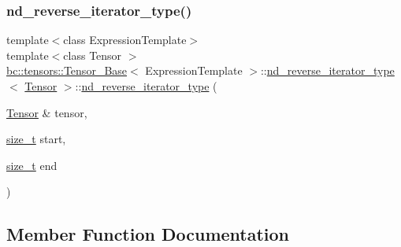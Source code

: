 \subsubsection{\texorpdfstring{nd\+\_\+reverse\+\_\+iterator\+\_\+type()}{nd\_reverse\_iterator\_type()}\hspace{0.1cm}{\footnotesize\ttfamily [3/3]}}
{\footnotesize\ttfamily template$<$class Expression\+Template$>$ \\
template$<$class Tensor $>$ \\
\hyperlink{classbc_1_1tensors_1_1Tensor__Base}{bc\+::tensors\+::\+Tensor\+\_\+\+Base}$<$ Expression\+Template $>$\+::\hyperlink{structbc_1_1tensors_1_1Tensor__Base_1_1nd__reverse__iterator__type}{nd\+\_\+reverse\+\_\+iterator\+\_\+type}$<$ \hyperlink{namespacebc_a659391e47ab612be3ba6c18cf9c89159}{Tensor} $>$\+::\hyperlink{structbc_1_1tensors_1_1Tensor__Base_1_1nd__reverse__iterator__type}{nd\+\_\+reverse\+\_\+iterator\+\_\+type} (\begin{DoxyParamCaption}\item[{\hyperlink{namespacebc_a659391e47ab612be3ba6c18cf9c89159}{Tensor} \&}]{tensor,  }\item[{\hyperlink{structbc_1_1tensors_1_1Tensor__Base_1_1nd__reverse__iterator__type_a7d4012a381490c1667a2fc0d6b7c0df4}{size\+\_\+t}}]{start,  }\item[{\hyperlink{structbc_1_1tensors_1_1Tensor__Base_1_1nd__reverse__iterator__type_a7d4012a381490c1667a2fc0d6b7c0df4}{size\+\_\+t}}]{end }\end{DoxyParamCaption})\hspace{0.3cm}{\ttfamily [inline]}}



\subsection{Member Function Documentation}
\mbox{\label{structbc_1_1tensors_1_1Tensor__Base_1_1nd__reverse__iterator__type_a66af3325cca78f481f612ca6bbae1b05}} 
